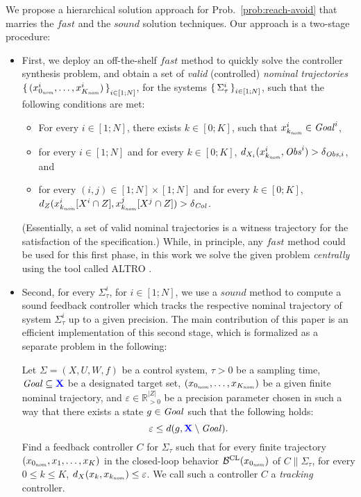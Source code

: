 We propose a hierarchical solution approach for Prob.~\ref{prob:reach-avoid} that marries the $\mathit{fast}$ and the $\mathit{sound}$ solution techniques.
Our approach is a two-stage procedure: 
\begin{itemize}
	\item First, we deploy an off-the-shelf $\mathit{fast}$ method to quickly solve the controller synthesis problem, and obtain a set of  \emph{valid} (controlled) \emph{nominal trajectories} $\set{(x_{0_{\mathit{nom}}}^i,\ldots,x_{K_{\mathit{nom}}}^i)}_{i\in [1;N]}$, for the systems $\set{\Sigma_\tau^i}_{i\in [1;N]}$, such that the following conditions are met:
	\begin{itemize}
		\item For every $i\in [1;N]$, there exists $k\in [0;K]$, such that $x_{k_{\mathit{nom}}}^i\in \mathit{Goal}^i$,
		\item for every $i\in [1;N]$ and for every $k\in [0;K]$, $d_{X_i}(x_{k_{\mathit{nom}}}^i,\mathit{Obs}^i) > \delta_{\mathit{Obs},i}$, and
		\item for every $(i,j)\in [1;N]\times [1;N]$ and for every $k\in [0;K]$, $d_{Z}(x_{k_{\mathit{nom}}}^i[X^i\cap Z], x_{k_{\mathit{nom}}}^j[X^j\cap Z]) > \delta_{\mathit{Col}}$. 
	\end{itemize}
	(Essentially, a set of valid nominal trajectories is a witness trajectory for the satisfaction of the specification.)
	While, in principle, any $\mathit{fast}$ method could be used for this first phase, in this work we solve the given problem \emph{centrally} using the tool called ALTRO \cite{howell2019altro}.
	\item Second, for every $\Sigma^i_\tau$, for $i\in [1;N]$, we use a $\mathit{sound}$ method to compute a sound feedback controller which tracks the respective nominal trajectory of system $\Sigma^i_\tau$ up to a given precision.
The main contribution of this paper is an efficient implementation of this second stage, which is formalized as a separate problem in the following:
		\begin{problem}\label{prob:tracking_with_time}
			Let $\Sigma=(X,U,W,f)$ be a control system, $\tau>0$ be a sampling time, $\mathit{Goal}\subseteq {\color{blue} \mathbf{X}}$ be a designated target set, $(x_{0_{\mathit{nom}}},\ldots,x_{K_{\mathit{nom}}})$ be a given finite nominal trajectory, and $\varepsilon\in \mathbb{R}^{|Z|}_{>0}$ be a precision parameter chosen in such a way that there exists a state $g\in \mathit{Goal}$ such that the following holds:
			\begin{equation}\label{eq:choice of eps}
				\varepsilon \leq d(g, {\color{blue} \mathbf{X}}\setminus \mathit{Goal}). 
			\end{equation}
			Find a feedback controller $C$ for $\Sigma_\tau$ such that 
			for every finite trajectory $(x_{0_{\mathit{nom}}},x_1,\ldots,x_K)$ in the closed-loop behavior $\mathcal{B}^{\mathrm{CL}}(x_{0_{\mathit{nom}}})$ of $C \parallel \Sigma_\tau$, for every $0\leq k \leq K$, $d_X(x_k, x_{k_{\mathit{nom}}}) \leq \varepsilon$.
			We call such a controller $C$ a \emph{tracking} controller.
		\end{problem}
\end{itemize}

